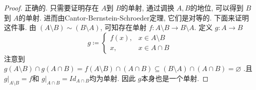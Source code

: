 \documentclass[../main.tex]{subfiles}
\begin{document}
\begin{proof}
    正确的. 只需要证明存在 \(  A  \)到 \(  B  \)的单射, 通过调换 \(  A,B  \)的地位, 可以得到 \(  B  \)到 \(  A  \)的单射. 进而由Cantor-Bernstein-Schroeder定理, 它们是对等的. 下面来证明这件事. 由 \(  \left( A\setminus B \right)\sim \left( B\setminus A \right)    \), 可知存在单射 \(  f:A\setminus B\to B\setminus A  \). 定义 \(  g:A\to B  \) \[
    g\coloneqq\begin{cases} f\left( x \right),&x \in A\setminus B\\ 
     x,&x \in A\cap B  \end{cases} 
    \]       注意到 \(  g\left( A\setminus B \right)\cap g\left( A\cap B \right)= f\left( A\setminus B \right)\cap \left( A\cap B \right)\subseteq \left( B\setminus A \right)\cap \left( A\cap B \right)= \varnothing        \) .且 \(  g|_{A\setminus B} = f \)和 \(  g|_{A\cap B}= Id _{A\cap B}  \)均为单射. 因此 \(  g  \)本身也是一个单射.   
\end{proof}
\end{document}
